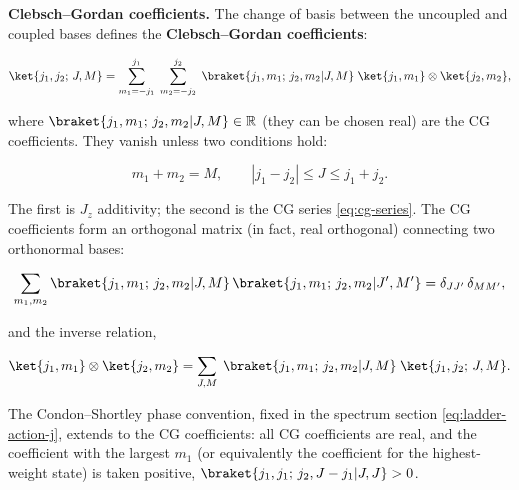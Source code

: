 \medskip\noindent\textbf{Clebsch--Gordan coefficients.}
The change of basis between the uncoupled and coupled bases defines the \textbf{Clebsch--Gordan coefficients}:
\begin{linenomath}
  \begin{equation}
    \ket{j_1,j_2;\,J,M}
    = \sum_{m_1=-j_1}^{j_1}\;
      \sum_{m_2=-j_2}^{j_2}\;
      \braket{j_1,m_1;\,j_2,m_2|J,M}\;
      \ket{j_1,m_1}\otimes\ket{j_2,m_2},
    \label{eq:cg-def}
  \end{equation}
\end{linenomath}
where $\braket{j_1,m_1;\,j_2,m_2|J,M} \in \mathbb{R}$ (they can be chosen real) are the CG coefficients. They vanish unless two conditions hold:
\begin{linenomath}
  \begin{equation}
    m_1 + m_2 = M,
    \qquad
    |j_1 - j_2| \le J \le j_1 + j_2.
  \end{equation}
\end{linenomath}
The first is $J_z$ additivity; the second is the CG series \eqref{eq:cg-series}. The CG coefficients form an orthogonal matrix (in fact, real orthogonal) connecting two orthonormal bases:
\begin{linenomath}
  \begin{equation}
    \sum_{m_1,m_2}
      \braket{j_1,m_1;\,j_2,m_2|J,M}\,
      \braket{j_1,m_1;\,j_2,m_2|J',M'}
    = \delta_{JJ'}\,\delta_{MM'},
  \end{equation}
\end{linenomath}
and the inverse relation,
\begin{linenomath}
  \begin{equation}
    \ket{j_1,m_1}\otimes\ket{j_2,m_2}
    = \sum_{J,M}\;
      \braket{j_1,m_1;\,j_2,m_2|J,M}\;
      \ket{j_1,j_2;\,J,M}.
  \end{equation}
\end{linenomath}
The Condon--Shortley phase convention, fixed in the spectrum section \eqref{eq:ladder-action-j}, extends to the CG coefficients: all CG coefficients are real, and the coefficient with the largest $m_1$ (or equivalently the coefficient for the highest-weight state) is taken positive, $\braket{j_1,j_1;\,j_2,J-j_1|J,J} > 0$.

